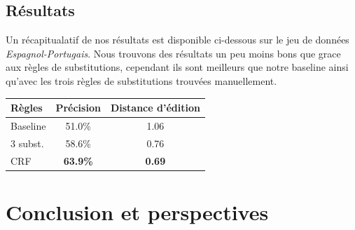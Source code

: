 \documentclass{article}
\begin{document}
\subsection{Résultats}
Un récapitualatif de nos résultats est disponible ci-dessous sur le jeu de données \emph{Espagnol-Portugais}. Nous trouvons des résultats un peu moins bons que grace aux règles de substitutions, cependant ils sont meilleurs que notre baseline ainsi qu'avec les trois règles de substitutions trouvées manuellement.
\begin{center}
\begin{tabular}{|l|c|c|}
\hline
Règles&Précision&Distance d'édition\\
\hline
Baseline&51.0\%&1.06\\
\hline
3 subst.&58.6\%&0.76\\
\hline
CRF&\textbf{63.9\%}&\textbf{0.69}\\
\hline
\end{tabular}
\end{center}

\section{Conclusion et perspectives}
\nocite{*}


\end{document}

